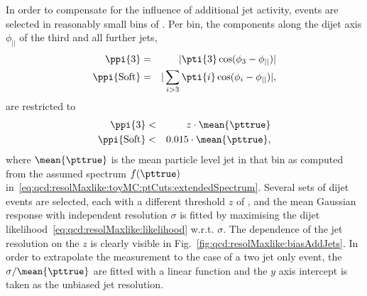 
In order to compensate for the influence of additional jet activity,
events are selected in reasonably small bins of \ptave.
Per bin, the \pt components along the dijet axis $\phi_{||}$ of the third and all further jets,
\begin{eqnarray*}
  \ppi{3} & = & |\pti{3}\cos(\phi_{3}-\phi_{||})| \\
  \ppi{\text{Soft}} & = & |\sum_{i>3}\pti{i}\cos(\phi_{i}-\phi_{||})|,
\end{eqnarray*}
are restricted to
\begin{eqnarray*}
  \ppi{3} & < & z\cdot\mean{\pttrue} \\
  \ppi{\text{Soft}} & < & 0.015\cdot\mean{\pttrue},
\end{eqnarray*}
where $\mean{\pttrue}$ is the mean particle level jet \pt in that bin
as computed from the assumed spectrum $f(\pttrue)$
in~\eqref{eq:qcd:resolMaxlike:toyMC:ptCuts:extendedSpectrum}.
Several sets of dijet events are selected, each with a different
threshold $z$ of , and the mean Gaussian response with \pt
independent resolution $\sigma$ is fitted by maximising the dijet
likelihood~\eqref{eq:qcd:resolMaxlike:likelihood} w.r.t. $\sigma$.
The dependence of the jet \pt resolution on the $z$ is clearly visible in Fig.~\ref{fig:qcd:resolMaxlike:biasAddJets}.
In order to extrapolate the measurement to the case of a two jet only
event, the \mbox{$\sigma/\mean{\pttrue}$} are fitted with a linear
function and the $y$ axis intercept is taken as the unbiased jet \pt
resolution.

